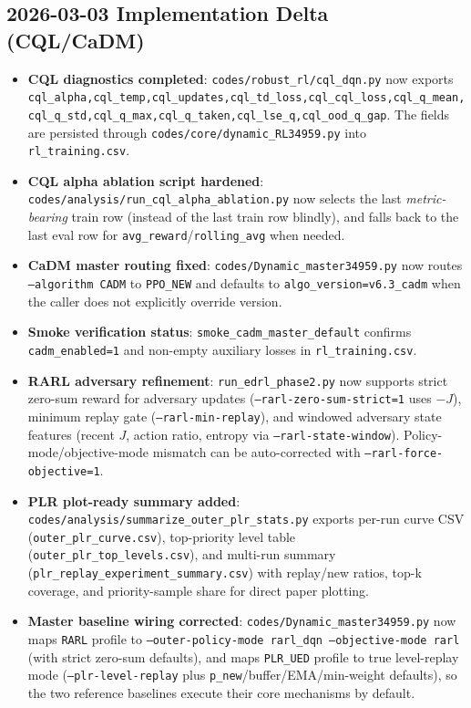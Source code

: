 \documentclass[UTF8,11pt,a4paper]{ctexart}
\begin{document}
\subsection{2026-03-03 Implementation Delta (CQL/CaDM)}
\begin{itemize}
\item \textbf{CQL diagnostics completed}: \texttt{codes/robust\_rl/cql\_dqn.py} now exports
\texttt{cql\_alpha,cql\_temp,cql\_updates,cql\_td\_loss,cql\_cql\_loss,cql\_q\_mean,cql\_q\_std,cql\_q\_max,cql\_q\_taken,cql\_lse\_q,cql\_ood\_q\_gap}.
The fields are persisted through \texttt{codes/core/dynamic\_RL34959.py} into \texttt{rl\_training.csv}.
\item \textbf{CQL alpha ablation script hardened}: \texttt{codes/analysis/run\_cql\_alpha\_ablation.py}
now selects the last \emph{metric-bearing} train row (instead of the last train row blindly), and falls back to the last eval row for
\texttt{avg\_reward}/\texttt{rolling\_avg} when needed.
\item \textbf{CaDM master routing fixed}: \texttt{codes/Dynamic\_master34959.py} now routes
\texttt{--algorithm CADM} to \texttt{PPO\_NEW} and defaults to \texttt{algo\_version=v6.3\_cadm}
when the caller does not explicitly override version.
\item \textbf{Smoke verification status}: \texttt{smoke\_cadm\_master\_default} confirms
\texttt{cadm\_enabled=1} and non-empty auxiliary losses in \texttt{rl\_training.csv}.
\item \textbf{RARL adversary refinement}: \texttt{run\_edrl\_phase2.py} now supports
strict zero-sum reward for adversary updates (\texttt{--rarl-zero-sum-strict=1} uses \(-J\)),
minimum replay gate (\texttt{--rarl-min-replay}), and windowed adversary state features
(recent \(J\), action ratio, entropy via \texttt{--rarl-state-window}).
Policy-mode/objective-mode mismatch can be auto-corrected with \texttt{--rarl-force-objective=1}.
\item \textbf{PLR plot-ready summary added}: \texttt{codes/analysis/summarize\_outer\_plr\_stats.py}
exports per-run curve CSV (\texttt{outer\_plr\_curve.csv}), top-priority level table
(\texttt{outer\_plr\_top\_levels.csv}), and multi-run summary
(\texttt{plr\_replay\_experiment\_summary.csv}) with replay/new ratios, top-k coverage, and
priority-sample share for direct paper plotting.
\item \textbf{Master baseline wiring corrected}: \texttt{codes/Dynamic\_master34959.py}
now maps \texttt{RARL} profile to \texttt{--outer-policy-mode rarl\_dqn --objective-mode rarl}
(with strict zero-sum defaults), and maps \texttt{PLR\_UED} profile to true level-replay mode
(\texttt{--plr-level-replay} plus \texttt{p\_new}/buffer/EMA/min-weight defaults), so the two
reference baselines execute their core mechanisms by default.
\end{itemize}
\end{document}
